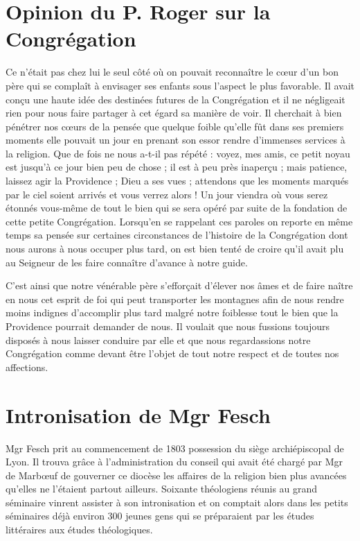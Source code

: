 \section*{Opinion du P. Roger sur la Congrégation}
Ce n'était pas chez lui le seul côté où on pouvait reconnaître le cœur d'un bon père qui se complaît à envisager ses enfants sous l'aspect le plus favorable. Il avait conçu une haute idée des destinées futures de la Congrégation et il ne négligeait rien pour nous faire partager à cet égard sa manière de voir. Il cherchait à bien pénétrer nos cœurs de la pensée que quelque foible qu'elle fût dans ses premiers moments elle pouvait un jour en prenant son essor rendre d'immenses services à la religion. Que de fois ne nous a-t-il pas répété : voyez, mes amis, ce petit noyau est jusqu'à ce jour bien peu de chose ; il est à peu près inaperçu ; mais patience, laissez agir la Providence ; Dieu a ses vues ; attendons que les moments marqués par le ciel soient arrivés et vous verrez
alors ! Un jour viendra où vous serez étonnés vous-même de tout le bien qui se sera opéré par suite de la fondation de cette petite Congrégation. Lorsqu'en se rappelant ces paroles on reporte en même temps sa pensée sur certaines circonstances de l'histoire de la Congrégation dont nous aurons à nous occuper plus tard, on est bien tenté de croire qu'il avait plu au Seigneur de les faire connaître d'avance à notre guide.

C'est ainsi que notre vénérable père s'efforçait d'élever nos âmes et de faire naître en nous cet esprit de foi qui peut transporter les montagnes afin de nous rendre moins indignes d'accomplir plus tard malgré notre foiblesse tout le bien que la Providence pourrait demander de nous. Il voulait que nous fussions toujours disposés à nous laisser conduire par elle et que nous regardassions notre Congrégation comme devant être l'objet de tout notre respect et de toutes nos affections.

\section*{Intronisation de Mgr Fesch}
Mgr Fesch prit au commencement de 1803 possession du siège archiépiscopal de Lyon. Il trouva grâce à l'administration du conseil qui avait été chargé par Mgr de Marbœuf de gouverner ce diocèse les affaires de la religion bien plus avancées qu'elles ne l'étaient partout ailleurs. Soixante théologiens réunis au grand séminaire vinrent assister à son intronisation et on comptait alors dans les petits séminaires déjà environ 300 jeunes gens qui se préparaient par les études littéraires aux études théologiques.

